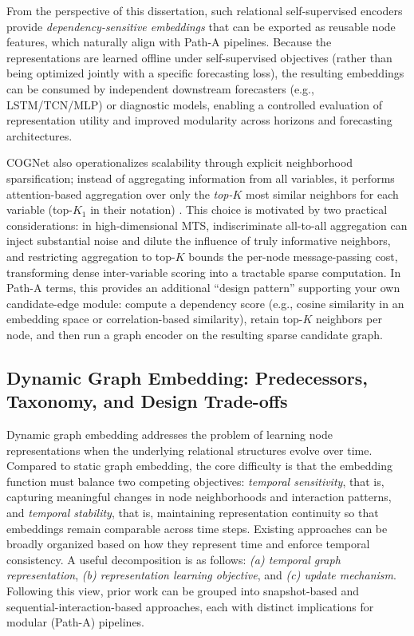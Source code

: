 From the perspective of this dissertation, such relational self-supervised encoders provide \emph{dependency-sensitive embeddings} that can be exported as reusable node features, which naturally align with Path-A pipelines. Because the representations are learned offline under self-supervised objectives (rather than being optimized jointly with a specific forecasting loss), the resulting embeddings can be consumed by independent downstream forecasters (e.g., LSTM/TCN/MLP) or diagnostic models, enabling a controlled evaluation of representation utility and improved modularity across horizons and forecasting architectures.

COGNet also operationalizes scalability through explicit neighborhood sparsification; instead of aggregating information from all variables, it performs attention-based aggregation over only the \emph{top-$K$} most similar neighbors for each variable (top-$K_1$ in their notation) \cite{wang2024cognet}. This choice is motivated by two practical considerations: in high-dimensional MTS, indiscriminate all-to-all aggregation can inject substantial noise and dilute the influence of truly informative neighbors, and restricting aggregation to top-$K$ bounds the per-node message-passing cost, transforming dense inter-variable scoring into a tractable sparse computation. In Path-A terms, this provides an additional “design pattern” supporting your own candidate-edge module: compute a dependency score (e.g., cosine similarity in an embedding space or correlation-based similarity), retain top-$K$ neighbors per node, and then run a graph encoder on the resulting sparse candidate graph.

\subsection{Dynamic Graph Embedding: Predecessors, Taxonomy, and Design Trade-offs}
\label{subsec:dynamic_embedding_predecessors_deep}

Dynamic graph embedding addresses the problem of learning node representations when the underlying relational structures evolve over time. Compared to static graph embedding, the core difficulty is that the embedding function must balance two competing objectives: \emph{temporal sensitivity}, that is, capturing meaningful changes in node neighborhoods and interaction patterns, and \emph{temporal stability}, that is, maintaining representation continuity so that embeddings remain comparable across time steps. Existing approaches can be broadly organized based on how they represent time and enforce temporal consistency. A useful decomposition is as follows: \emph{(a) temporal graph representation}, \emph{(b) representation learning objective}, and \emph{(c) update mechanism}. Following this view, prior work can be grouped into snapshot-based and sequential-interaction-based approaches, each with distinct implications for modular (Path-A) pipelines.


